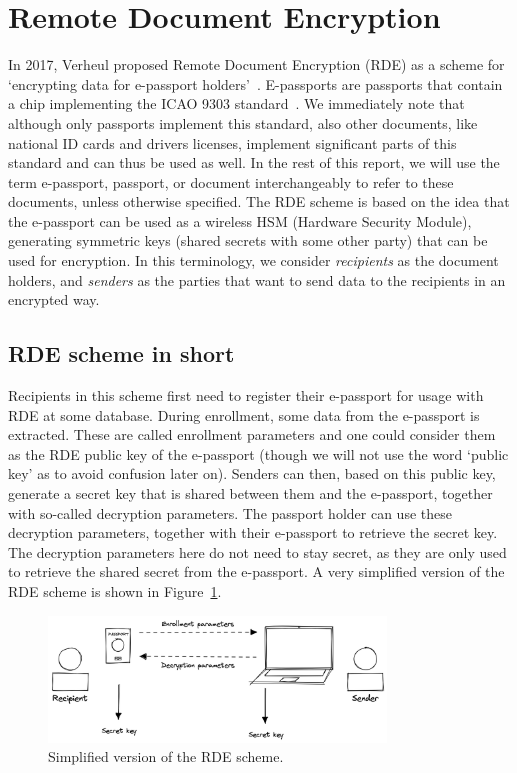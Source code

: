 \section{Remote Document Encryption}\label{sec:remote-document-encryption}
In 2017, Verheul proposed Remote Document Encryption (RDE) as a scheme for `encrypting data for e-passport holders'~\cite{verheul2017remote}.
E-passports are passports that contain a chip implementing the ICAO 9303 standard~\cite{icao9303securitymechanisms}.
We immediately note that although only passports implement this standard, also other documents, like national ID cards and drivers licenses, implement significant parts of this standard and can thus be used as well.
In the rest of this report, we will use the term e-passport, passport, or document interchangeably to refer to these documents, unless otherwise specified.
The RDE scheme is based on the idea that the e-passport can be used as a wireless HSM (Hardware Security Module), generating symmetric keys (shared secrets with some other party) that can be used for encryption.
In this terminology, we consider \textit{recipients} as the document holders, and \textit{senders} as the parties that want to send data to the recipients in an encrypted way.

\subsection{RDE scheme in short}\label{subsec:rde-scheme-in-short}
Recipients in this scheme first need to register their e-passport for usage with RDE at some database.
During enrollment, some data from the e-passport is extracted.
These are called enrollment parameters and one could consider them as the RDE public key of the e-passport (though we will not use the word `public key' as to avoid confusion later on).
Senders can then, based on this public key, generate a secret key that is shared between them and the e-passport, together with so-called decryption parameters.
The passport holder can use these decryption parameters, together with their e-passport to retrieve the secret key.
The decryption parameters here do not need to stay secret, as they are only used to retrieve the shared secret from the e-passport.
A very simplified version of the RDE scheme is shown in Figure~\ref{fig:rde-scheme-very-simple}.
\begin{figure}
    \centering
    \includegraphics[width=0.8\textwidth]{imgs/RDE very simple}
    \caption{Simplified version of the RDE scheme.}
    \label{fig:rde-scheme-very-simple}
\end{figure}

